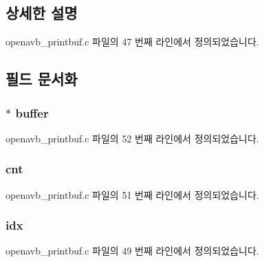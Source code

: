 \subsection{상세한 설명}


openavb\+\_\+printbuf.\+c 파일의 47 번째 라인에서 정의되었습니다.



\subsection{필드 문서화}
\subsubsection[{\texorpdfstring{buffer}{buffer}}]{$\ast$ buffer}\hypertarget{structopenavb__printbuf_a5650d6922748fed794d7b3934873eb2f}{}\label{structopenavb__printbuf_a5650d6922748fed794d7b3934873eb2f}


openavb\+\_\+printbuf.\+c 파일의 52 번째 라인에서 정의되었습니다.

\subsubsection[{\texorpdfstring{cnt}{cnt}}]{ cnt}\hypertarget{structopenavb__printbuf_abe5857ca0e41a9da956c09127e4d9309}{}\label{structopenavb__printbuf_abe5857ca0e41a9da956c09127e4d9309}


openavb\+\_\+printbuf.\+c 파일의 51 번째 라인에서 정의되었습니다.

\subsubsection[{\texorpdfstring{idx}{idx}}]{ idx}\hypertarget{structopenavb__printbuf_af782e1749c5ec70098cf26c9c5c90f6c}{}\label{structopenavb__printbuf_af782e1749c5ec70098cf26c9c5c90f6c}


openavb\+\_\+printbuf.\+c 파일의 49 번째 라인에서 정의되었습니다.

